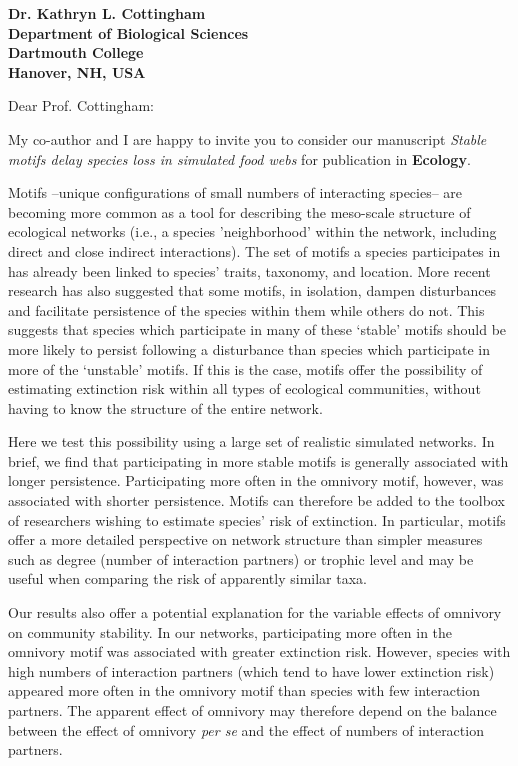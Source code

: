\documentclass[12pt]{letter}
\begin{document}
\begin{letter}{\bf Dr. Kathryn L. Cottingham \\
Department of Biological Sciences \\
Dartmouth College \\
Hanover, NH, USA}


\opening{Dear Prof. Cottingham:}

  My co-author and I are happy to invite you to consider our manuscript
  \emph{Stable motifs delay species loss in simulated food webs} for publication in \textbf{Ecology}.


	Motifs --unique configurations of small numbers of interacting species-- are becoming more common as a tool for describing the meso-scale structure of ecological networks (i.e., a species 'neighborhood' within the network, including direct and close indirect interactions). 
	The set of motifs a species participates in has already been linked to species' traits, taxonomy, and location.
	More recent research has also suggested that some motifs, in isolation, dampen disturbances and facilitate persistence of the species within them while others do not.
	This suggests that species which participate in many of these `stable' motifs should be more likely to persist following a disturbance than species which participate in more of the `unstable' motifs.
	If this is the case, motifs offer the possibility of estimating extinction risk within all types of ecological communities, without having to know the structure of the entire network.


	Here we test this possibility using a large set of realistic simulated networks. In brief, we find that participating in more stable motifs is generally associated with longer persistence. Participating more often in the omnivory motif, however, was associated with shorter persistence. Motifs can therefore be added to the toolbox of researchers wishing to estimate species' risk of extinction. In particular, motifs offer a more detailed perspective on network structure than simpler measures such as degree (number of interaction partners) or trophic level and may be useful when comparing the risk of apparently similar taxa.


 	Our results also offer a potential explanation for the variable effects of omnivory on community stability. In our networks, participating more often in the omnivory motif was associated with greater extinction risk. However, species with high numbers of interaction partners (which tend to have lower extinction risk) appeared more often in the omnivory motif than species with few interaction partners. The apparent effect of omnivory may therefore depend on the balance between the effect of omnivory \emph{per se} and the effect of numbers of interaction partners.



\end{letter}
\end{document}
